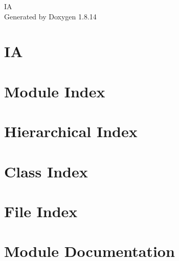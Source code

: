 \documentclass[twoside]{book}
\newcommand{\+}{\discretionary{\mbox{\scriptsize$\hookleftarrow$}}{}{}}
\newcommand{\clearemptydoublepage}{%
  \newpage{\pagestyle{empty}\cleardoublepage}%
}
\begin{document}
\hypersetup{pageanchor=false,
             bookmarksnumbered=true,
             pdfencoding=unicode
            }
\begin{titlepage}
\vspace*{7cm}
\begin{center}%
{\Large IA }\\
\vspace*{1cm}
{\large Generated by Doxygen 1.8.14}\\
\end{center}
\end{titlepage}
\clearemptydoublepage
{}
\tableofcontents
\clearemptydoublepage
{}
\hypersetup{pageanchor=true}

\chapter{IA}
\label{md__r_e_a_d_m_e}

\chapter{Module Index}

\chapter{Hierarchical Index}

\chapter{Class Index}

\chapter{File Index}

\chapter{Module Documentation}

























\end{document}
